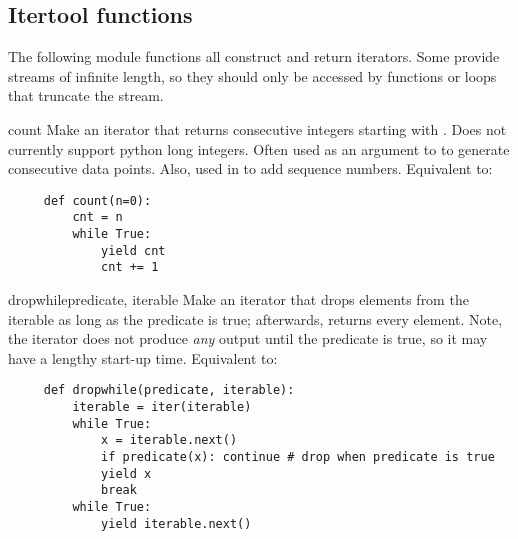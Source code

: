 \begin{seealso}

\end{seealso}


\subsection{Itertool functions \label{itertools-functions}}

The following module functions all construct and return iterators.
Some provide streams of infinite length, so they should only be accessed
by functions or loops that truncate the stream.

\begin{funcdesc}{count}{}
  Make an iterator that returns consecutive integers starting with .
  Does not currently support python long integers.  Often used as an
  argument to  to generate consecutive data points.
  Also, used in  to add sequence numbers.  Equivalent to:

  \begin{verbatim}
     def count(n=0):
         cnt = n
         while True:
             yield cnt
             cnt += 1
  \end{verbatim}
\end{funcdesc}

\begin{funcdesc}{dropwhile}{predicate, iterable}
  Make an iterator that drops elements from the iterable as long as
  the predicate is true; afterwards, returns every element.  Note,
  the iterator does not produce \emph{any} output until the predicate
  is true, so it may have a lengthy start-up time.  Equivalent to:

  \begin{verbatim}
     def dropwhile(predicate, iterable):
         iterable = iter(iterable)
         while True:
             x = iterable.next()
             if predicate(x): continue # drop when predicate is true
             yield x
             break
         while True:
             yield iterable.next()
  \end{verbatim}
\end{funcdesc}

